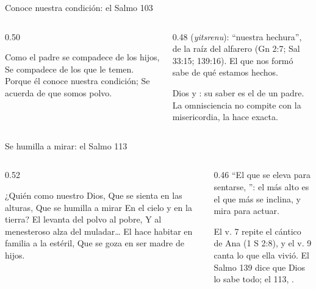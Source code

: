 \begin{frame}{Conoce nuestra condición: el Salmo 103}
\begin{columns}[t,onlytextwidth]
\begin{column}{0.50\textwidth}
\begin{cita}Como el padre se compadece de los hijos, Se compadece \SENOR{} de los que le temen. Porque él conoce nuestra condición; Se acuerda de que somos polvo.\end{cita}
\begin{center}\end{center}
\end{column}
\begin{column}{0.48\textwidth}\small
{} (\emph{yitsrenu}): ``nuestra hechura'', de la raíz del alfarero (Gn 2:7; Sal 33:15; 139:16). El que nos formó sabe de qué estamos hechos.\par\medskip
Dios  y : su saber es el de un padre. La omnisciencia no compite con la misericordia, la hace exacta.\par\medskip
{}
\end{column}
\end{columns}
\end{frame}

\begin{frame}{Se humilla a mirar: el Salmo 113}
\begin{columns}[t,onlytextwidth]
\begin{column}{0.52\textwidth}
\begin{cita}¿Quién como \SENOR{} nuestro Dios, Que se sienta en las alturas, Que se humilla a mirar En el cielo y en la tierra? El levanta del polvo al pobre, Y al menesteroso alza del muladar\ldots{} El hace habitar en familia a la estéril, Que se goza en ser madre de hijos.\end{cita}
\begin{center}\end{center}
\end{column}
\begin{column}{0.46\textwidth}\small
``El que se eleva para sentarse, '': el más alto es el que más se inclina, y mira para actuar.\par\medskip
El v. 7 repite el cántico de Ana (1 S 2:8), y el v. 9 canta lo que ella vivió. El Salmo 139 dice que Dios lo sabe todo; el 113, .\par\medskip
{}
\end{column}
\end{columns}
\end{frame}

